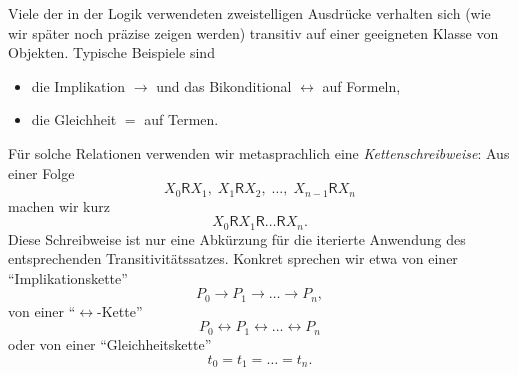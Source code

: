\documentclass[main.tex]{subfiles}
\begin{document}
\begin{remark}
Viele der in der Logik verwendeten zweistelligen Ausdrücke verhalten
sich (wie wir später noch präzise zeigen werden) transitiv auf einer
geeigneten Klasse von Objekten. Typische Beispiele sind
\begin{itemize}
  \item die Implikation \(\rightarrow\) und das Bikonditional
        \(\leftrightarrow\) auf Formeln,
  \item die Gleichheit \(=\) auf Termen.
\end{itemize}
Für solche Relationen verwenden wir metasprachlich eine
\emph{Kettenschreibweise}: Aus einer Folge
\[
  X_0 \mathsf R X_1,\; X_1 \mathsf R X_2,\; \dots,\;
  X_{n-1} \mathsf R X_n
\]
machen wir kurz
\[
  X_0 \mathsf R X_1 \mathsf R \dots \mathsf R X_n.
\]
Diese Schreibweise ist nur eine Abkürzung für die iterierte Anwendung
des entsprechenden Transitivitätssatzes. Konkret sprechen wir etwa von
einer \enquote{Implikationskette}
\[
  P_0 \rightarrow P_1 \rightarrow \dots \rightarrow P_n,
\]
von einer \enquote{\(\leftrightarrow\)-Kette}
\[
  P_0 \leftrightarrow P_1 \leftrightarrow \dots \leftrightarrow P_n
\]
oder von einer \enquote{Gleichheitskette}
\[
  t_0 = t_1 = \dots = t_n.
\]
\end{remark}
\end{document}

